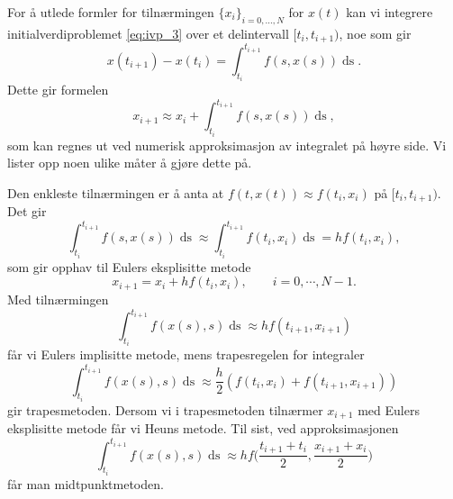 \documentclass{article}
\theoremstyle{plain}
\theoremstyle{definition}
\theoremstyle{remark}
\newcommand{\diff}[1]{\mathop{d#1}}
\newcommand{\fcn}{x}
\newcommand{\bigparanth}[1]{\big(#1\big)}
\begin{document}
For å utlede formler for tilnærmingen $\{\fcn_i\}_{i = 0, ..., N}$ for $\fcn(t)$ kan vi integrere initialverdiproblemet \eqref{eq:ivp_3} over et delintervall $[t_i, t_{i+1})$, noe som gir
\begin{equation*}
    \fcn(t_{i+1}) - \fcn(t_i) = \int_{t_i}^{t_{i+1}} f(s, \fcn(s)) \diff{s}.
\end{equation*}
Dette gir formelen
\begin{equation*}
    \fcn_{i+1} \approx \fcn_i + \int_{t_i}^{t_{i+1}} f(s, \fcn(s)) \diff{s},
\end{equation*}
som kan regnes ut ved numerisk approksimasjon av integralet på høyre side. Vi lister opp noen ulike måter å gjøre dette på.

Den enkleste tilnærmingen er å anta at $f(t, \fcn(t)) \approx f(t_i, \fcn_i)$ på $[t_i, t_{i+1})$. Det gir
\begin{equation*}
    \int_{t_i}^{t_{i+1}} f(s, \fcn(s)) \diff{s} \approx \int_{t_i}^{t_{i+1}} f(t_i, \fcn_i) \diff{s} = h f(t_i, \fcn_i),
\end{equation*}
som gir opphav til Eulers eksplisitte metode
\begin{equation*}
    \fcn_{i + 1} = \fcn_i + h f(t_i, \fcn_i), \qquad i = 0, \cdots, N - 1.
\end{equation*}
Med tilnærmingen
\begin{equation*}
    \int_{t_i}^{t_{i+1}} f(\fcn(s), s) \diff{s} \approx h f(t_{i+1}, \fcn_{i+1})
\end{equation*}
får vi Eulers implisitte metode, mens trapesregelen for integraler
\begin{equation*}
    \int_{t_i}^{t_{i+1}} f(\fcn(s), s) \diff{s} \approx \frac{h}{2} (f(t_{i}, \fcn_{i}) + f(t_{i+1}, \fcn_{i+1}))
\end{equation*}
gir trapesmetoden. Dersom vi i trapesmetoden tilnærmer $\fcn_{i+1}$ med Eulers eksplisitte metode får vi Heuns metode. Til sist, ved approksimasjonen
\begin{equation*}
    \int_{t_i}^{t_{i+1}} f(\fcn(s), s) \diff{s} \approx h f\bigparanth{\frac{t_{i+1} + t_i}{2}, \frac{\fcn_{i+1} + \fcn_i}{2}}
\end{equation*}
får man midtpunktmetoden.
\end{document}
